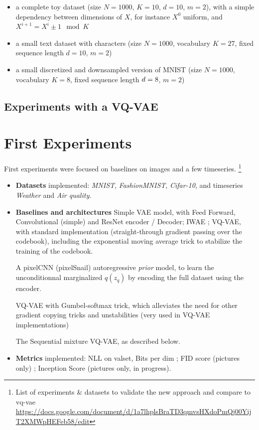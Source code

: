 \documentclass{article}
\begin{document}
\begin{itemize}
	\item a complete toy dataset (size $N=1000$, $K=10$, $d=10$, $m=2$), with a simple dependency between dimensions of $X$, for instance $X^0$ uniform, and $X^{i+1} = X^i \pm 1 \mod K$
	\item a small text dataset with characters (size $N=1000$, vocabulary $K=27$, fixed sequence length $d=10$, $m=2$)
	\item a small discretized and downsampled version of MNIST (size $N=1000$, vocabulary $K=8$, fixed sequence length $d=8 \time 8$, $m=2$)
\end{itemize}

\subsection{Experiments with a VQ-VAE}








\clearpage
\newpage

\section{First Experiments}
First experiments were focused on baselines on images and a few timeseries. \footnote{List of experiments \& datasets to validate the new approach and compare to vq-vae \url{https://docs.google.com/document/d/1a7lhplsBraTD3qmvsHXdoPmQj00YijT2XMWpHEFeb58/edit}}

\begin{itemize}
	\item \textbf{Datasets} implemented: {\em MNIST}, {\em FashionMNIST}, {\em Cifar-10}, and timeseries {\em Weather} and {\em Air quality}.
	\item \textbf{Baselines and architectures} Simple VAE model, with Feed Forward, Convolutional (simple) and ResNet encoder / Decoder; IWAE ; VQ-VAE, with standard implementation (straight-through gradient passing over the codebook), including the exponential moving average trick to stabilize the training of the codebook.

	A pixelCNN (pixelSnail) autoregressive \textit{prior} model, to learn the unconditionnal marginalized $q(z_q)$ by encoding the full dataset using the encoder.

	VQ-VAE with Gumbel-softmax trick, which alleviates the need for other gradient copying tricks and unstabilities (very used in VQ-VAE implementations)

	The Sequential mixture VQ-VAE, as described below.
  \item \textbf{Metrics} implemented: NLL on valset, Bits per dim ; FID score (pictures only) ; Inception Score (pictures only, in progress).
\end{itemize}
\end{document}

